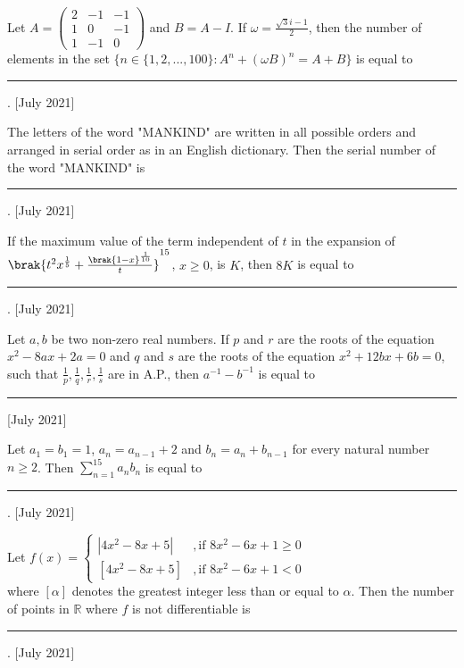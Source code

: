 \iffalse
\title{July 2021}
\author{AI24BTECH11012}
\section{integer}
\fi
  
  
  \item Let $A = \begin{pmatrix} 2 & -1 & -1 \\ 1 & 0 & -1 \\ 1 & -1 & 0 \end{pmatrix}$ and $B = A - I$. If $\omega = \frac{\sqrt{3}i - 1}{2}$, then the number of elements in the set $\{n \in \{1, 2, ..., 100\} : A^n + (\omega B)^n = A + B\}$ is equal to \rule{2.5cm}{0.4pt}.
  \hfill{[July 2021]}
    
    \item The letters of the word "MANKIND" are written in all possible orders and arranged in serial order as in an English dictionary. Then the serial number of the word "MANKIND" is \rule{2.5cm}{0.4pt}.
    \hfill{[July 2021]}
    
    \item If the maximum value of the term independent of $t$ in the expansion of $\brak{t^{2}x^{\frac{1}{5}}+\frac{\brak{1-x}^{\frac{1}{10}}}{t}}^{15}$, $x \geq 0$, is $K$, then $8K$ is equal to \rule{2.5cm}{0.4pt}.
    \hfill{[July 2021]}
    
    \item Let $a, b$ be two non-zero real numbers. If $p$ and $r$ are the roots of the equation $x^2 - 8ax + 2a = 0$ and $q$ and $s$ are the roots of the equation $x^2 + 12bx + 6b = 0$, such that $\frac{1}{p}, \frac{1}{q}, \frac{1}{r}, \frac{1}{s}$ are in A.P., then $a^{-1} - b^{-1}$ is equal to \rule{2.5cm}{0.4pt}
    \hfill{[July 2021]}
    
    \item Let $a_1 = b_1 = 1$, $a_n = a_{n-1} + 2$ and $b_n = a_n + b_{n-1}$ for every natural number $n \geq 2$. Then $\sum_{n=1}^{15} a_n b_n$ is equal to \rule{2.5cm}{0.4pt}.
    \hfill{[July 2021]}
    
    \item Let $    f(x) =
    \begin{cases}
        |4x^2-8x+5| & , \text{if } 8x^2-6x+1 \geq 0 \\
        [4x^2-8x+5] & , \text{if } 8x^2-6x+1 < 0
    \end{cases}$\\where $[\alpha]$ denotes the greatest integer less than or equal to $\alpha$. Then the number of points in $\mathbb{R}$ where $f$ is not differentiable is \rule{2.5cm}{0.4pt}.
    \hfill{[July 2021]}
    
